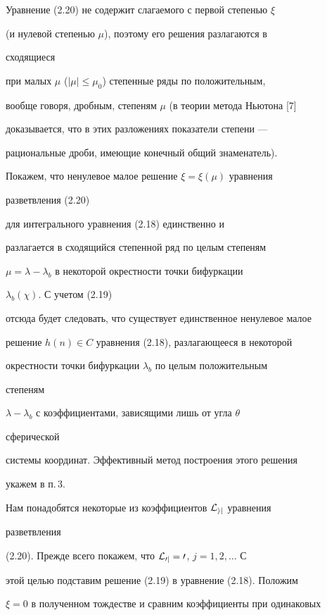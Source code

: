  


Уравнение (2.20) не содержит слагаемого с первой степенью $\xi$ 


(и нулевой степенью $\mu$), поэтому его решения разлагаются в 


сходящиеся 


при малых $\mu$ ($|\mu|\le\mu_0$) степенные ряды по положительным,  


вообще говоря, дробным, степеням $\mu$ (в теории метода Ньютона [7]  


доказывается, что в этих разложениях показатели степени --- 


рациональные дроби, имеющие конечный общий знаменатель). 


 


Покажем, что ненулевое малое решение $\xi=\xi(\mu)$ уравнения 


разветвления (2.20) 


для интегрального уравнения (2.18) единственно и 


разлагается в сходящийся степенной ряд по целым степеням 


$\mu=\lambda-\lambda_b$ в некоторой окрестности точки бифуркации 


$\lambda_b(\chi)$. С учетом (2.19) 


отсюда будет следовать, что существует единственное ненулевое малое 


решение $h(n)\in C$ уравнения (2.18), разлагающееся в некоторой 


окрестности точки бифуркации $\lambda_b$ по целым положительным 


степеням 


$\lambda-\lambda_b$ с коэффициентами, зависящими лишь от угла $\theta$ 


сферической 


системы координат. Эффективный метод построения этого решения 


укажем в п.\,3. 


 


Нам понадобятся некоторые из коэффициентов $\cal L_{ij}$ уравнения 


разветвления 


(2.20). Прежде всего покажем, что $\cal L_{0j}=0$, $j=1,2,\dotsc$ С 


этой целью подставим решение (2.19) в уравнение (2.18). Положим  


$\xi=0$ в полученном тождестве и сравним коэффициенты при одинаковых 


